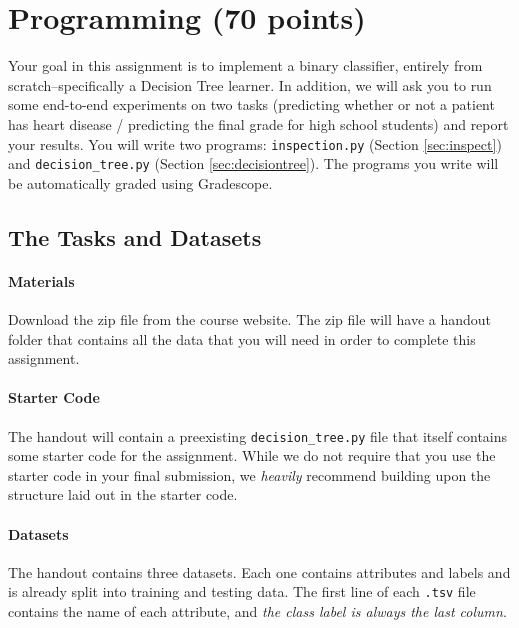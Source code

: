 \section{Programming (70 points)}

Your goal in this assignment is to implement a binary classifier, entirely from scratch--specifically a Decision Tree learner. In addition, we will ask you to run some end-to-end experiments on two tasks (predicting whether or not a patient has heart disease / predicting the final grade for high school students) and report your results.
%
You will write two programs: \texttt{inspection.py} (Section \ref{sec:inspect}) and \texttt{decision\_tree.py} (Section \ref{sec:decisiontree}). The programs you write will be automatically graded using Gradescope.

\subsection{The Tasks and Datasets}
\label{sec:data}

\paragraph{Materials} Download the zip file from the course website. The zip file will have a handout folder that contains all the data that you will need in order to complete this assignment.

\paragraph{Starter Code} The handout will contain a preexisting \texttt{decision\_tree.py} file that itself contains some starter code for the assignment. While we do not require that you use the starter code in your final submission, we \emph{heavily} recommend building upon the structure laid out in the starter code.

\paragraph{Datasets}

The handout contains three datasets. Each one contains attributes and labels and is already split into training and testing data. The first line of each \lstinline{.tsv} file contains the name of each attribute, and \emph{the class label is always the last column}.

